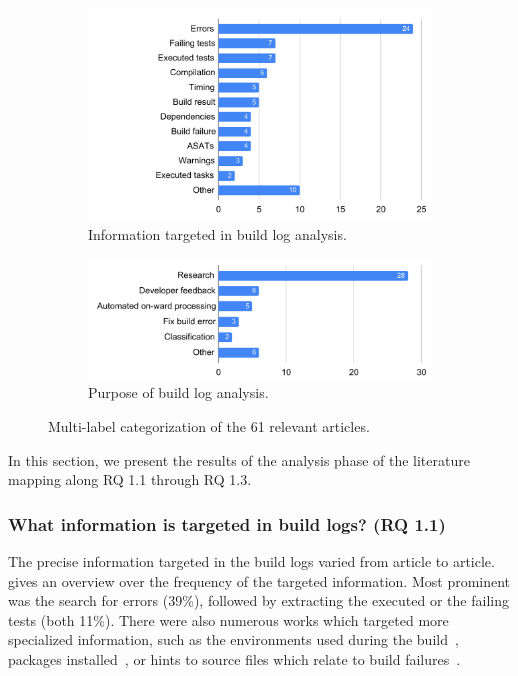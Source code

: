 \begin{figure}
\centering
\begin{subfigure}[t]{\columnwidth}
		\centering
		\includegraphics[width=\columnwidth,
		clip]{img/lit-sur/info_target.pdf}
		\caption{Information targeted in build log analysis.}
		\label{fig:litsur:info_target}

\end{subfigure}\hspace{\fill}
\begin{subfigure}[t]{\columnwidth}
		\centering
				\includegraphics[width=\columnwidth,
				clip]{img/lit-sur/use.pdf}
		\caption{Purpose of build log analysis.}
		\label{fig:litsur:use}

\end{subfigure}

\caption{Multi-label categorization of the 61 relevant articles.}
\end{figure}


In this section, we present the results of the analysis phase of the
literature mapping along RQ 1.1 through RQ 1.3.

\subsubsection{What information is targeted in build logs? (RQ 1.1)}
The precise information targeted in the build logs varied from article
to article.
 gives an overview over the frequency of
the targeted information.
Most prominent was the search for errors (39\%), followed by extracting
the executed or the failing
tests (both 11\%).
There were also numerous works which targeted more specialized
information, such as the environments used during the
build~\cite{zolfagharinia2017not}, packages
installed~\cite{selberg2012use}, or hints to source files which
relate to build failures~\cite{ren2018automated}.

